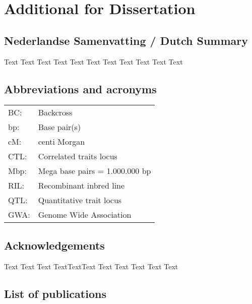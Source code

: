 \documentclass[11pt, twoside, a5paper]{report}
\begin{document}
\chapter{Additional for Dissertation}
\section*{Nederlandse Samenvatting / Dutch Summary}
Text Text Text Text Text Text Text Text Text Text Text

\section*{Abbreviations and acronyms}
\begin{tabular}{ l l }
BC:          & Backcross \\
bp:          & Base pair(s) \\
cM:          & centi Morgan \\
CTL:         & Correlated traits locus \\
Mbp:         & Mega base pairs = 1.000.000 bp \\
RIL:         & Recombinant inbred line \\
QTL:         & Quantitative trait locus \\
GWA:         & Genome Wide Association \\
\end{tabular}

\section*{Acknowledgements}
Text Text Text TextTextText Text Text Text Text Text

\section*{List of publications}
\end{document}
